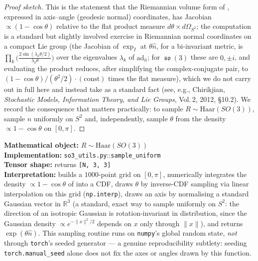 \documentclass[11pt,a4paper]{report}
\theoremstyle{definition}
\theoremstyle{remark}
\DeclareMathOperator{\so}{\mathfrak{so}}
\newcommand{\RR}{\mathbb R}
\newcommand{\file}[1]{\texttt{#1}}
\newcommand{\pyfunc}[1]{\texttt{#1}}
\newcommand{\shape}[1]{\texttt{[#1]}}
\begin{document}
\begin{proof}[Proof sketch]
This is the statement that the Riemannian volume form of
, expressed in axis--angle (geodesic normal)
coordinates, has Jacobian $\propto(1-\cos\theta)$ relative to the flat
product measure $d\theta\times d\Omega_{S^2}$; the computation is a standard
but slightly involved exercise in Riemannian normal coordinates on a compact
Lie group (the Jacobian of $\exp_I$ at $\theta\widehat n$, for a bi-invariant
metric, is $\prod_k \bigl(\tfrac{2\sin(\lambda_k\theta/2)}{\lambda_k\theta}\bigr)$
over the eigenvalues $\lambda_k$ of $\mathrm{ad}_{\widehat n}$; for $\so(3)$
these are $0,\pm i$, and evaluating the product reduces, after simplifying
the complex-conjugate pair, to $(1-\cos\theta)/(\theta^2/2)\cdot(\text{const})$
times the flat measure), which we do not carry out in full here and instead
take as a standard fact (see, e.g., Chirikjian, \emph{Stochastic Models,
Information Theory, and Lie Groups}, Vol.\,2, 2012, \S10.2). We record the
consequence that matters practically: to sample $R\sim\mathrm{Haar}(SO(3))$,
sample $n$ uniformly on $S^2$ and, independently, sample $\theta$ from the
density $\propto1-\cos\theta$ on $[0,\pi]$.
\end{proof}

\begin{codebox}
\textbf{Mathematical object:} $R\sim\mathrm{Haar}(SO(3))$ \\
\textbf{Implementation:} \file{so3\_utils.py}::\pyfunc{sample\_uniform} \\
\textbf{Tensor shape:} returns \shape{N, 3, 3} \\
\textbf{Interpretation:} builds a $1000$-point grid on $[0,\pi]$, numerically
integrates the density $\propto1-\cos\theta$ of  into a
CDF, draws $\theta$ by inverse-CDF sampling via linear interpolation on
this grid (\pyfunc{np.interp}), draws an axis by normalising a standard
Gaussian vector in $\RR^3$ (a standard, exact way to sample uniformly on
$S^2$: the direction of an isotropic Gaussian is rotation-invariant in
distribution, since the Gaussian density $\propto e^{-\|x\|^2/2}$ depends
on $x$ only through $\|x\|$), and returns $\exp(\theta\widehat n)$. This
sampling routine runs on \texttt{numpy}'s global random state, \emph{not}
through \pyfunc{torch}'s seeded generator --- a genuine reproducibility
subtlety: seeding \pyfunc{torch.manual\_seed} alone does not fix the axes
or angles drawn by this function.
\end{codebox}
\end{document}
